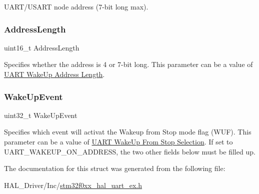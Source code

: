 U\+A\+R\+T/\+U\+S\+A\+RT node address (7-\/bit long max). \mbox{\label{struct_u_a_r_t___wake_up_type_def_a5be92432486df9b5320d668c236e1b6f}} 
\subsubsection{\texorpdfstring{Address\+Length}{AddressLength}}
{\footnotesize\ttfamily uint16\+\_\+t Address\+Length}

Specifies whether the address is 4 or 7-\/bit long. This parameter can be a value of \hyperlink{group___u_a_r_t___wake_up___address___length}{U\+A\+RT Wake\+Up Address Length}. \mbox{\label{struct_u_a_r_t___wake_up_type_def_a1146a984a15b77174e96057cb88e4f59}} 
\subsubsection{\texorpdfstring{Wake\+Up\+Event}{WakeUpEvent}}
{\footnotesize\ttfamily uint32\+\_\+t Wake\+Up\+Event}

Specifies which event will activat the Wakeup from Stop mode flag (W\+UF). This parameter can be a value of \hyperlink{group___u_a_r_t___wake_up__from___stop___selection}{U\+A\+RT Wake\+Up From Stop Selection}. If set to U\+A\+R\+T\+\_\+\+W\+A\+K\+E\+U\+P\+\_\+\+O\+N\+\_\+\+A\+D\+D\+R\+E\+SS, the two other fields below must be filled up. 

The documentation for this struct was generated from the following file\+:\begin{DoxyCompactItemize}
\item 
H\+A\+L\+\_\+\+Driver/\+Inc/\hyperlink{stm32f0xx__hal__uart__ex_8h}{stm32f0xx\+\_\+hal\+\_\+uart\+\_\+ex.\+h}\end{DoxyCompactItemize}
